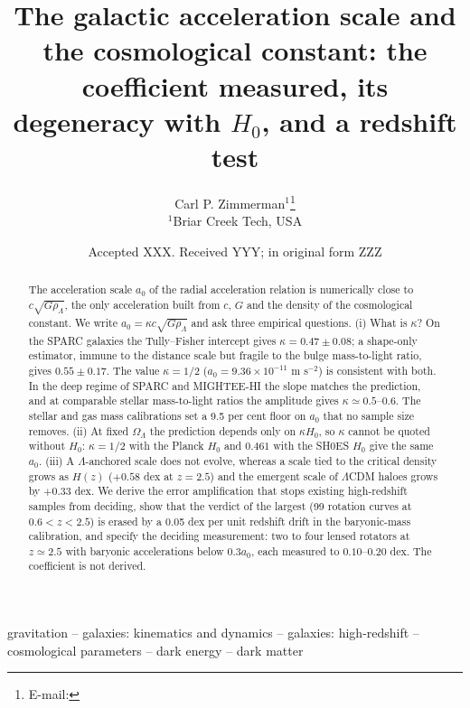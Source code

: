 \documentclass[fleqn,usenatbib]{mnras}
\title[The $a_0$--$\Lambda$ relation and its redshift test]{The galactic acceleration scale and the cosmological constant: the coefficient measured, its degeneracy with $H_0$, and a redshift test}
\author[C. P. Zimmerman]{Carl P. Zimmerman$^{1}$\thanks{E-mail: \authoremail}
\\
$^{1}$Briar Creek Tech, USA}
\date{Accepted XXX. Received YYY; in original form ZZZ}
\begin{document}
\label{firstpage}
\pagerange{\pageref{firstpage}--\pageref{lastpage}}
\maketitle

\begin{abstract}
The acceleration scale $a_0$ of the radial acceleration relation is numerically close to $c\sqrt{G\rho_\Lambda}$, the only acceleration built from $c$, $G$ and the density of the cosmological constant. We write $a_0=\kappa c\sqrt{G\rho_\Lambda}$ and ask three empirical questions. (i) What is $\kappa$? On the SPARC galaxies the Tully--Fisher intercept gives $\kappa=0.47\pm0.08$; a shape-only estimator, immune to the distance scale but fragile to the bulge mass-to-light ratio, gives $0.55\pm0.17$. The value $\kappa=1/2$ ($a_0=9.36\times10^{-11}$ m s$^{-2}$) is consistent with both. In the deep regime of SPARC and MIGHTEE-HI the slope matches the prediction, and at comparable stellar mass-to-light ratios the amplitude gives $\kappa\simeq0.5$--$0.6$. The stellar and gas mass calibrations set a 9.5 per cent floor on $a_0$ that no sample size removes. (ii) At fixed $\Omega_\Lambda$ the prediction depends only on $\kappa H_0$, so $\kappa$ cannot be quoted without $H_0$: $\kappa=1/2$ with the Planck $H_0$ and $0.461$ with the SH0ES $H_0$ give the same $a_0$. (iii) A $\Lambda$-anchored scale does not evolve, whereas a scale tied to the critical density grows as $H(z)$ ($+0.58$ dex at $z=2.5$) and the emergent scale of $\Lambda$CDM haloes grows by $+0.33$ dex. We derive the error amplification that stops existing high-redshift samples from deciding, show that the verdict of the largest (99 rotation curves at $0.6<z<2.5$) is erased by a 0.05 dex per unit redshift drift in the baryonic-mass calibration, and specify the deciding measurement: two to four lensed rotators at $z\simeq2.5$ with baryonic accelerations below $0.3a_0$, each measured to $0.10$--$0.20$ dex. The coefficient is not derived.
\end{abstract}

\begin{keywords}
gravitation -- galaxies: kinematics and dynamics -- galaxies: high-redshift -- cosmological parameters -- dark energy -- dark matter
\end{keywords}

\end{document}
